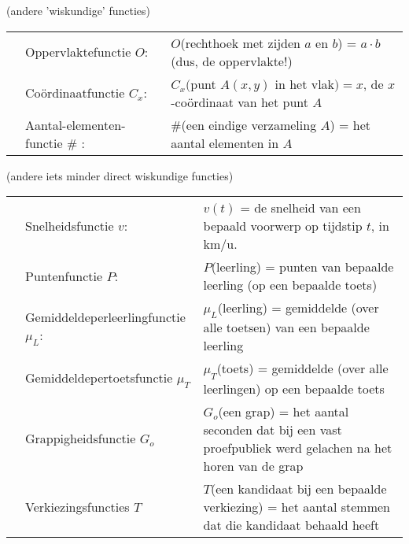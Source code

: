 \documentclass{ximera}
\begin{document}
\begin{example} (andere 'wiskundige' functies)

\begin{tabular}[t]{l l l}
    & Oppervlaktefunctie $O$:    & $O$(rechthoek met zijden $a$ en $b$) = $a\cdot b$ (dus, de oppervlakte!) \\
    & Coördinaatfunctie $C_x$\footnotemark[3]:     & $C_x($punt $A(x,y) $ in het vlak$) = x$, de $x$-coördinaat van het punt $A$  \\
    & Aantal-elementen-functie \# \footnotemark[4]: & \#(een eindige verzameling $A$) = het aantal elementen in $A$
\end{tabular}

\end{example}

\begin{example} (andere iets minder direct wiskundige functies)
    
\begin{tabular}{l l p{8cm}}
    & Snelheidsfunctie $v$:     & $v(t)$ = de snelheid van een bepaald voorwerp op tijdstip $t$, in km/u.  \\    
    & Puntenfunctie $P$:        & $P$(leerling) = punten van bepaalde leerling (op een bepaalde toets)  \\
    & Gemiddeldeperleerlingfunctie $\mu_L$: & $\mu_L$(leerling) = gemiddelde (over alle toetsen) van een bepaalde leerling  \\
    & Gemiddeldepertoetsfunctie $\mu_T$ & $\mu_T$(toets) = gemiddelde (over alle leerlingen) op een bepaalde toets \\
    & Grappigheidsfunctie $G_o$  & $G_o$(een grap) = het aantal seconden dat bij een vast proefpubliek  werd gelachen na het horen van de grap \\
    & Verkiezingsfuncties $T$   & $T$(een kandidaat bij een bepaalde verkiezing) =  het aantal stemmen dat die kandidaat behaald heeft \\
\end{tabular}
\end{example}
\end{document}
